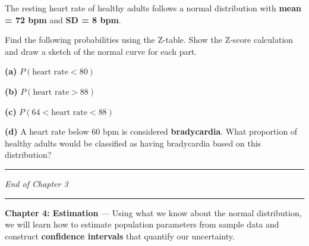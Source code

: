 \documentclass[
  12pt,
  letterpaper,
]{book}
\begin{document}
\begin{tcolorbox}[enhanced jigsaw, arc=.35mm, bottomrule=.15mm, bottomtitle=1mm, breakable, colback=white, colbacktitle=quarto-callout-caution-color!10!white, colframe=quarto-callout-caution-color-frame, coltitle=black, left=2mm, leftrule=.75mm, opacityback=0, opacitybacktitle=0.6, rightrule=.15mm, title={✏️ Exercise 3}, titlerule=0mm, toprule=.15mm, toptitle=1mm]

The resting heart rate of healthy adults follows a normal distribution
with \textbf{mean = 72 bpm} and \textbf{SD = 8 bpm}.

Find the following probabilities using the Z-table. Show the Z-score
calculation and draw a sketch of the normal curve for each part.

\textbf{(a)} \(P(\text{heart rate} < 80)\)

\textbf{(b)} \(P(\text{heart rate} > 88)\)

\textbf{(c)} \(P(64 < \text{heart rate} < 88)\)

\textbf{(d)} A heart rate below 60 bpm is considered
\textbf{bradycardia}. What proportion of healthy adults would be
classified as having bradycardia based on this distribution?

\end{tcolorbox}

\begin{center}\rule{0.5\linewidth}{0.5pt}\end{center}

\emph{End of Chapter 3}

\begin{center}\rule{0.5\linewidth}{0.5pt}\end{center}

\begin{tcolorbox}[enhanced jigsaw, arc=.35mm, bottomrule=.15mm, bottomtitle=1mm, breakable, colback=white, colbacktitle=quarto-callout-note-color!10!white, colframe=quarto-callout-note-color-frame, coltitle=black, left=2mm, leftrule=.75mm, opacityback=0, opacitybacktitle=0.6, rightrule=.15mm, title={📚 Coming Up Next}, titlerule=0mm, toprule=.15mm, toptitle=1mm]

\textbf{Chapter 4: Estimation} --- Using what we know about the normal
distribution, we will learn how to estimate population parameters from
sample data and construct \textbf{confidence intervals} that quantify
our uncertainty.

\end{tcolorbox}

\end{document}
